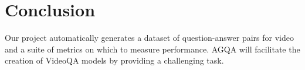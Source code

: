 \documentclass[10pt,twocolumn,letterpaper]{article}
\begin{document}
\section{Conclusion}
Our project automatically generates a dataset of question-answer pairs for video and a suite of metrics on which to measure performance.
AGQA will facilitate the creation of VideoQA models by providing a challenging task.

{\small


}
\end{document}
